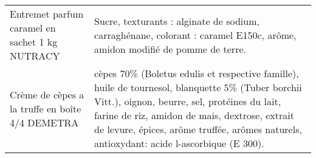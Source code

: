 \begin{longtable}{p{5cm}p{10cm}}
                                                           Entremet parfum caramel en sachet 1 kg NUTRACY &                                                                                                                                                                                                                                                                                                                                                                                                                                                                                                                                                                                                                                                                                                                                                                                                                                                                                                                 Sucre, texturants : alginate de sodium, carraghénane, colorant : caramel E150c, arôme, amidon modifié de pomme de terre. \\
                                                          Crème de cèpes a la truffe en boîte 4/4 DEMETRA &                                                                                                                                                                                                                                                                                                                                                                                                                                                                                                                                                                                                                                                                                                                                          cèpes 70\% (Boletus edulis et respective famille), huile de tournesol, blanquette 5\% (Tuber borchii Vitt.), oignon, beurre, sel, protéines du lait, farine de riz, amidon de mais, dextrose, extrait de levure, épices, arôme truffée, arômes naturels, antioxydant: acide l-ascorbique (E 300). \\

\end{longtable}
